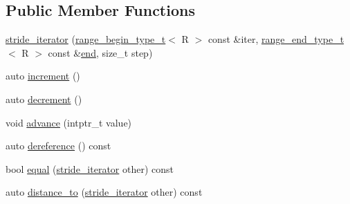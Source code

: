 \subsection*{Public Member Functions}
\begin{DoxyCompactItemize}
\item 
\mbox{\hyperlink{struct_r_a_h___n_a_m_e_s_p_a_c_e_1_1view_1_1stride__iterator_a4aeb915e3f46829e15c6dcbb7f7fae56}{stride\+\_\+iterator}} (\mbox{\hyperlink{namespace_r_a_h___n_a_m_e_s_p_a_c_e_a46705781d6869d5151141f871ced1e9c}{range\+\_\+begin\+\_\+type\+\_\+t}}$<$ R $>$ const \&iter, \mbox{\hyperlink{namespace_r_a_h___n_a_m_e_s_p_a_c_e_aadeb8c12d454f4cc70bf80766871d3b2}{range\+\_\+end\+\_\+type\+\_\+t}}$<$ R $>$ const \&\mbox{\hyperlink{namespace_r_a_h___n_a_m_e_s_p_a_c_e_ad5f90a809a5221569377c400175a20bf}{end}}, size\+\_\+t step)
\item 
auto \mbox{\hyperlink{struct_r_a_h___n_a_m_e_s_p_a_c_e_1_1view_1_1stride__iterator_ae576499e34e79e69abb098da95df0976}{increment}} ()
\item 
auto \mbox{\hyperlink{struct_r_a_h___n_a_m_e_s_p_a_c_e_1_1view_1_1stride__iterator_ada1710cdcc7a83efb9333f69d3eb0d45}{decrement}} ()
\item 
void \mbox{\hyperlink{struct_r_a_h___n_a_m_e_s_p_a_c_e_1_1view_1_1stride__iterator_a73a6c28f8f18ea5a72abad3d3496201b}{advance}} (intptr\+\_\+t value)
\item 
auto \mbox{\hyperlink{struct_r_a_h___n_a_m_e_s_p_a_c_e_1_1view_1_1stride__iterator_a17abd01fbb81f71d6619aab81eafcdf0}{dereference}} () const
\item 
bool \mbox{\hyperlink{struct_r_a_h___n_a_m_e_s_p_a_c_e_1_1view_1_1stride__iterator_aca913bf726fcb5ed4de3c7dd2bc8d800}{equal}} (\mbox{\hyperlink{struct_r_a_h___n_a_m_e_s_p_a_c_e_1_1view_1_1stride__iterator}{stride\+\_\+iterator}} other) const
\item 
auto \mbox{\hyperlink{struct_r_a_h___n_a_m_e_s_p_a_c_e_1_1view_1_1stride__iterator_a42a626384940d5b0dca993927b79cb0b}{distance\+\_\+to}} (\mbox{\hyperlink{struct_r_a_h___n_a_m_e_s_p_a_c_e_1_1view_1_1stride__iterator}{stride\+\_\+iterator}} other) const
\end{DoxyCompactItemize}
